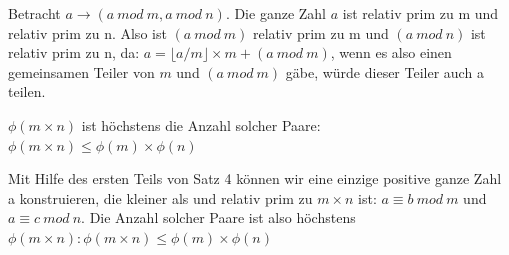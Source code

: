 \documentclass[a4paper]{article}
\begin{document}
\begin{multicols}{3}
\begin{itemize*}
\begin{itemize*}
                  \item Betracht $a\rightarrow(a\ mod\ m, a\ mod\ n)$. Die ganze Zahl $a$ ist relativ prim zu m und relativ prim zu n. Also ist $(a\ mod\ m)$ relativ prim zu m und $(a\ mod\ n)$ ist relativ prim zu n, da: $a=\lfloor a/m\rfloor\times m + (a\ mod\ m)$, wenn es also einen gemeinsamen Teiler von $m$ und $(a\ mod\ m)$ gäbe, würde dieser Teiler auch a teilen. %
                  \item $\phi(m \times n)$ ist höchstens die Anzahl solcher Paare: $\phi(m \times n)\leq \phi(m)\times \phi(n)$
                  \item %
                  Mit Hilfe des ersten Teils von Satz 4 können wir eine einzige positive ganze Zahl a konstruieren, die kleiner als und relativ prim zu $m\times n$ ist: $a\equiv b\ mod\ m$ und $a\equiv c\ mod\ n$. Die Anzahl solcher Paare ist also höchstens $\phi(m \times n):\phi(m \times n)\leq\phi(m)\times\phi(n)$
            \end{itemize*}
      \end{itemize*}


\end{multicols}
\end{document}
